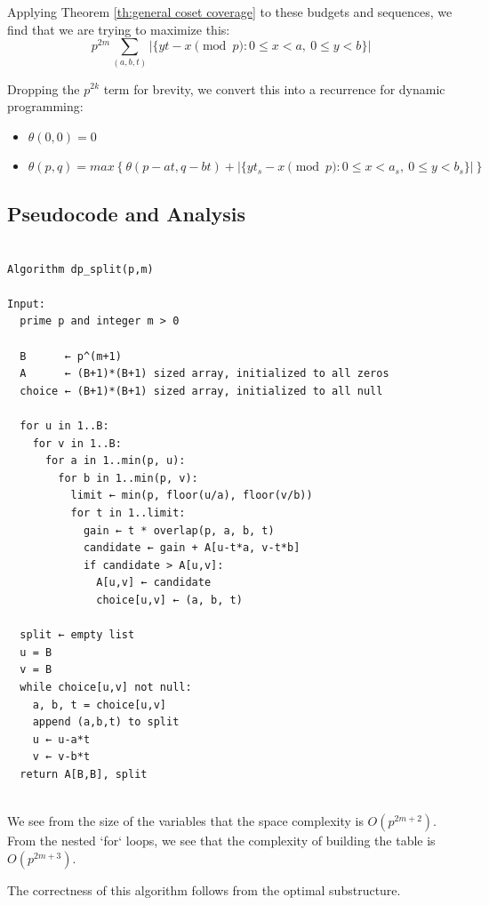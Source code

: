 Applying Theorem \ref{th:general coset coverage} to these budgets and sequences, we find that we are trying to maximize this:
$$ p^{2m} \sum_{(a,b,t)} |\{yt-x \pmod p : 0 \le x < a,\ 0 \le y < b\}|$$

Dropping the $p^{2k}$ term for brevity, we convert this into a recurrence for dynamic programming:
\begin{itemize}

\item  $\theta (0,0) = 0$

\item $\theta (p,q) = max\left\{ \theta(p-at, q-bt) + |\{yt_s-x \pmod p : 0 \le x < a_s,\ 0 \le y < b_s\}| \right\}$

\end{itemize}

\subsection{Pseudocode and Analysis}

\begin{verbatim}

Algorithm dp_split(p,m)

Input:
  prime p and integer m > 0

  B      ← p^(m+1)
  A      ← (B+1)*(B+1) sized array, initialized to all zeros  
  choice ← (B+1)*(B+1) sized array, initialized to all null  

  for u in 1..B:
    for v in 1..B:
      for a in 1..min(p, u):
        for b in 1..min(p, v):
          limit ← min(p, floor(u/a), floor(v/b))
          for t in 1..limit:
            gain ← t * overlap(p, a, b, t)
            candidate ← gain + A[u-t*a, v-t*b]
            if candidate > A[u,v]:
              A[u,v] ← candidate
              choice[u,v] ← (a, b, t)

  split ← empty list
  u = B
  v = B
  while choice[u,v] not null:
    a, b, t = choice[u,v]
    append (a,b,t) to split
    u ← u-a*t
    v ← v-b*t
  return A[B,B], split


\end{verbatim}

We see from the size of the variables that the space complexity is $O(p^{2m+2})$. From the nested `for` loops, we see that the complexity of building the table is $O(p^{2m+3})$.

The correctness of this algorithm follows from the optimal substructure. 

